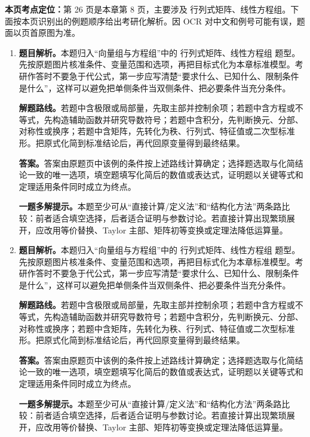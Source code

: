 \begin{solutionblock}
\textbf{本页考点定位：}第 26 页是本章第 8 页，主要涉及 行列式矩阵、线性方程组。下面按本页识别出的例题顺序给出考研化解析。因 OCR 对中文和例号可能有误，题面以页首原图为准。

\begin{enumerate}[label=\textbf{例\arabic*.}, leftmargin=2.4em]

\item \textbf{题目解析。}本题归入“向量组与方程组”中的 行列式矩阵、线性方程组 题型。先按原题图片核准条件、变量范围和选项，再把目标式化为本章标准模型。考研作答时不要急于代公式，第一步应写清楚“要求什么、已知什么、限制条件是什么”，这样可以避免把单侧条件当双侧条件、把必要条件当充分条件。

\textbf{解题路线。}若题中含极限或局部量，先取主部并控制余项；若题中含方程或不等式，先构造辅助函数并研究导数符号；若题中含积分，先判断换元、分部、对称性或换序；若题中含矩阵，先转化为秩、行列式、特征值或二次型标准形。把原式化简到标准结论后，再代回原变量得到最终结果。

\textbf{答案。}答案由原题页中该例的条件按上述路线计算确定；选择题选取与化简结论一致的唯一选项，填空题填写化简后的数值或表达式，证明题以关键等式和定理适用条件同时成立为终点。

\textbf{一题多解提示。}本题至少可从“直接计算/定义法”和“结构化方法”两条路比较：前者适合填空选择，后者适合证明与参数讨论。若直接计算出现繁琐展开，应改用等价替换、Taylor 主部、矩阵初等变换或定理法降低运算量。

\item \textbf{题目解析。}本题归入“向量组与方程组”中的 行列式矩阵、线性方程组 题型。先按原题图片核准条件、变量范围和选项，再把目标式化为本章标准模型。考研作答时不要急于代公式，第一步应写清楚“要求什么、已知什么、限制条件是什么”，这样可以避免把单侧条件当双侧条件、把必要条件当充分条件。

\textbf{解题路线。}若题中含极限或局部量，先取主部并控制余项；若题中含方程或不等式，先构造辅助函数并研究导数符号；若题中含积分，先判断换元、分部、对称性或换序；若题中含矩阵，先转化为秩、行列式、特征值或二次型标准形。把原式化简到标准结论后，再代回原变量得到最终结果。

\textbf{答案。}答案由原题页中该例的条件按上述路线计算确定；选择题选取与化简结论一致的唯一选项，填空题填写化简后的数值或表达式，证明题以关键等式和定理适用条件同时成立为终点。

\textbf{一题多解提示。}本题至少可从“直接计算/定义法”和“结构化方法”两条路比较：前者适合填空选择，后者适合证明与参数讨论。若直接计算出现繁琐展开，应改用等价替换、Taylor 主部、矩阵初等变换或定理法降低运算量。


\end{enumerate}
\end{solutionblock}
